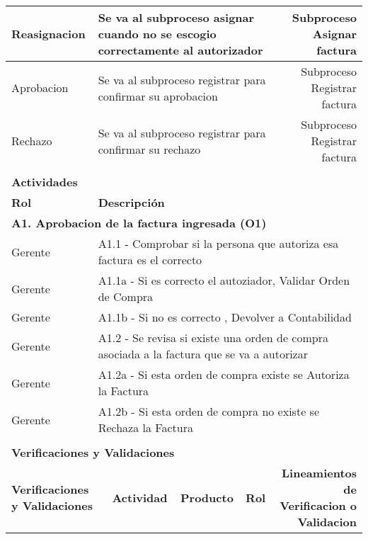 \begin{longtable}{|llrrrrrr|}
    Reasignacion & \multicolumn{5}{|m{6cm}|}{Se va al subproceso asignar cuando no se escogio correctamente al autorizador} & \multicolumn{2}{|m{3cm}|}{Subproceso Asignar factura} \\ \hline
    Aprobacion & \multicolumn{5}{|m{6cm}|}{Se va al subproceso registrar para confirmar su aprobacion} & \multicolumn{2}{|m{3cm}|}{Subproceso Registrar factura} \\ \hline
    Rechazo & \multicolumn{5}{|m{6cm}|}{Se va al subproceso registrar para confirmar su rechazo} & \multicolumn{2}{|m{3cm}|}{Subproceso Registrar factura} \\ \hline
       &       &       &       &       &       &       &  \\ \hline
	
	
	\multicolumn{8}{|l|}{\textbf{Actividades}} \\ \hline
    \textbf{Rol} & \multicolumn{7}{|l|}{\textbf{Descripción}} \\ \hline 
    \multicolumn{8}{|l|}{\textbf{A1. Aprobacion de la factura ingresada (O1) }} \\ \hline
     Gerente & \multicolumn{7}{|m{12cm}|}{A1.1 -  Comprobar si la persona que autoriza esa factura es el correcto} \\ \hline
     Gerente & \multicolumn{7}{|m{12cm}|}{A1.1a - Si es correcto el autoziador, Validar Orden de Compra } \\ \hline
     Gerente & \multicolumn{7}{|m{12cm}|}{A1.1b - Si no es correcto , Devolver a Contabilidad} \\ \hline
     Gerente & \multicolumn{7}{|m{12cm}|}{A1.2 - Se revisa si existe una orden de compra asociada a la factura que se va a autorizar} \\ \hline
     Gerente & \multicolumn{7}{|m{12cm}|}{A1.2a - Si esta orden de compra existe se Autoriza la Factura } \\ \hline
     Gerente & \multicolumn{7}{|m{12cm}|}{A1.2b - Si esta orden de compra no existe se Rechaza la Factura } \\ \hline
    
     & & & & & & & \\ \hline
	\multicolumn{8}{|l|}{\textbf{Verificaciones y Validaciones}} \\ \hline
	\multicolumn{2}{|m{3cm}|}{\textbf{Verificaciones y Validaciones}} & \multicolumn{1}{m{2cm}|}{\textbf{Actividad}} & \multicolumn{1}{m{2,2cm}|}{\textbf{Producto}} & \multicolumn{1}{m{1.5cm}|}{\textbf{Rol}} &\multicolumn{3}{m{4cm}|}{\textbf{Lineamientos de Verificacion o Validacion}} \\ \hline
	

\end{longtable}
